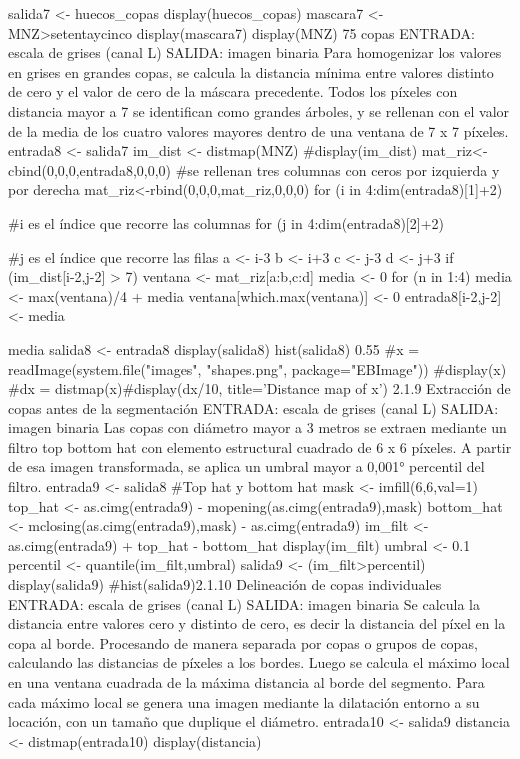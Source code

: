 salida7 <- huecos_copas
display(huecos_copas)
mascara7 <- MNZ>setentaycinco
display(mascara7)
display(MNZ)
75%
copas
ENTRADA: escala de grises (canal L)
SALIDA: imagen binaria
Para homogenizar los valores en grises en grandes copas, se calcula la distancia mínima
entre valores distinto de cero y el valor de cero de la máscara precedente. Todos los
píxeles con distancia mayor a 7 se identifican como grandes árboles, y se rellenan con el
valor de la media de los cuatro valores mayores dentro de una ventana de 7 x 7 píxeles.
entrada8 <- salida7
im_dist <- distmap(MNZ)
#display(im_dist)
mat_riz<-cbind(0,0,0,entrada8,0,0,0) #se rellenan tres columnas con ceros por izquierda
y por derecha
mat_riz<-rbind(0,0,0,mat_riz,0,0,0)
for (i in 4:dim(entrada8)[1]+2) { #i es el índice que recorre las columnas
  for (j in 4:dim(entrada8)[2]+2) { #j es el índice que recorre las filas
      a <- i-3
      b <- i+3      c <- j-3
      d <- j+3
      if (im_dist[i-2,j-2] > 7) {
           ventana <- mat_riz[a:b,c:d]
      media <- 0
      for (n in 1:4) {
          media <- max(ventana)/4 + media
          ventana[which.max(ventana)] <- 0
      }
      entrada8[i-2,j-2] <- media
      }
         
    
  }
 
}
media
salida8 <- entrada8
display(salida8)
hist(salida8)
0.55
#x = readImage(system.file("images", "shapes.png", package="EBImage"))
#display(x)
#dx = distmap(x)#display(dx/10, title='Distance map of x')
2.1.9 Extracción de copas antes de la segmentación
ENTRADA: escala de grises (canal L)
SALIDA: imagen binaria
Las copas con diámetro mayor a 3 metros se extraen mediante un filtro top bottom hat
con elemento estructural cuadrado de 6 x 6 píxeles. A partir de esa imagen
transformada, se aplica un umbral mayor a 0,001° percentil del filtro.
entrada9 <- salida8
#Top hat y bottom hat
mask <- imfill(6,6,val=1)
top_hat <- as.cimg(entrada9) - mopening(as.cimg(entrada9),mask)
bottom_hat <-  mclosing(as.cimg(entrada9),mask) - as.cimg(entrada9)
im_filt <- as.cimg(entrada9) + top_hat - bottom_hat
display(im_filt)
umbral <- 0.1
percentil <- quantile(im_filt,umbral)
salida9 <- (im_filt>percentil)
display(salida9)
#hist(salida9)2.1.10 Delineación de copas individuales
ENTRADA: escala de grises (canal L)
SALIDA: imagen binaria
Se calcula la distancia entre valores cero y distinto de cero, es decir la distancia del
píxel en la copa al borde. Procesando de manera separada por copas o grupos de copas,
calculando las distancias de píxeles a los bordes. Luego se calcula el máximo local en
una ventana cuadrada de la máxima distancia al borde del segmento. Para cada máximo
local se genera una imagen mediante la dilatación entorno a su locación, con un tamaño
que duplique el diámetro.
entrada10 <- salida9
distancia <- distmap(entrada10)
display(distancia)